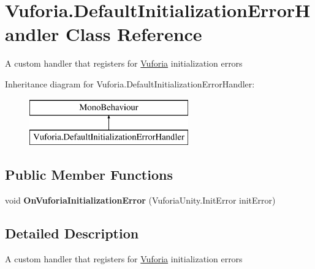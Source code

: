 \hypertarget{class_vuforia_1_1_default_initialization_error_handler}{}\section{Vuforia.\+Default\+Initialization\+Error\+Handler Class Reference}
\label{class_vuforia_1_1_default_initialization_error_handler}


A custom handler that registers for \hyperlink{namespace_vuforia}{Vuforia} initialization errors  


Inheritance diagram for Vuforia.\+Default\+Initialization\+Error\+Handler\+:\begin{figure}[H]
\begin{center}
\leavevmode
\includegraphics[height=2.000000cm]{class_vuforia_1_1_default_initialization_error_handler}
\end{center}
\end{figure}
\subsection*{Public Member Functions}
\begin{DoxyCompactItemize}
\item 
\hypertarget{class_vuforia_1_1_default_initialization_error_handler_a27f4fdae7026aa4ac64e0e3aeb92eed9}{}void {\bfseries On\+Vuforia\+Initialization\+Error} (Vuforia\+Unity.\+Init\+Error init\+Error)\label{class_vuforia_1_1_default_initialization_error_handler_a27f4fdae7026aa4ac64e0e3aeb92eed9}

\end{DoxyCompactItemize}


\subsection{Detailed Description}
A custom handler that registers for \hyperlink{namespace_vuforia}{Vuforia} initialization errors 

